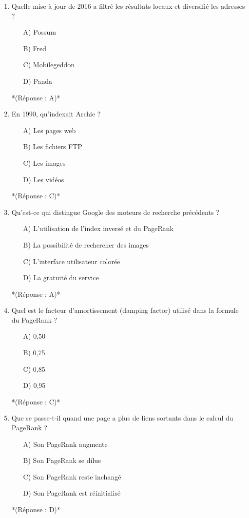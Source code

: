\documentclass[12pt,a4paper,twoside]{report}
\begin{document}
\begin{enumerate}
\item Quelle mise à jour de 2016 a filtré les résultats locaux et diversifié les adresses ?
\begin{itemize}
\item[A)] Possum
\item[B)] Fred
\item[C)] Mobilegeddon
\item[D)] Panda
\end{itemize}
*(Réponse : A)*

\item En 1990, qu'indexait Archie ?
\begin{itemize}
\item[A)] Les pages web
\item[B)] Les fichiers FTP
\item[C)] Les images
\item[D)] Les vidéos
\end{itemize}
*(Réponse : C)*

\item Qu'est-ce qui distingue Google des moteurs de recherche précédents ?
\begin{itemize}
\item[A)] L'utilisation de l'index inversé et du PageRank
\item[B)] La possibilité de rechercher des images
\item[C)] L'interface utilisateur colorée
\item[D)] La gratuité du service
\end{itemize}
*(Réponse : A)*

\item Quel est le facteur d'amortissement (damping factor) utilisé dans la formule du PageRank ?
\begin{itemize}
\item[A)] 0,50
\item[B)] 0,75
\item[C)] 0,85
\item[D)] 0,95
\end{itemize}
*(Réponse : C)*

\item Que se passe-t-il quand une page a plus de liens sortants dans le calcul du PageRank ?
\begin{itemize}
\item[A)] Son PageRank augmente
\item[B)] Son PageRank se dilue
\item[C)] Son PageRank reste inchangé
\item[D)] Son PageRank est réinitialisé
\end{itemize}
*(Réponse : D)*


\end{enumerate}
\end{document}
